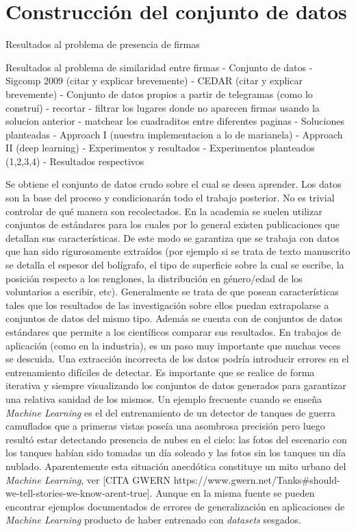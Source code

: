 
\chapter{Construcción del conjunto de datos}

Resultados al problema de presencia de firmas


Resultados al problema de similaridad entre firmas
- Conjunto de datos
	- Sigcomp 2009 (citar y explicar brevemente)
	- CEDAR (citar y explicar brevemente)
	- Conjunto de datos propios a partir de telegramas
	(como lo construí)
		- recortar
		- filtrar los lugares donde no aparecen firmas usando la solucion anterior
		- matchear los cuadraditos entre diferentes paginas
- Soluciones planteadas
	- Approach I (nuestra implementacion a lo de marianela)
	- Approach II (deep learning)
- Experimentos y resultados
	- Experimentos planteados (1,2,3,4)
	- Resultados respectivos


Se obtiene el conjunto de datos crudo sobre el cual se desea aprender. Los datos son la base del proceso y condicionarán todo el trabajo posterior. No es trivial controlar de qué manera son recolectados.
En la academia se suelen utilizar conjuntos de estándares para los cuales por lo general existen publicaciones que detallan sus características. De este modo se garantiza que se trabaja con datos que han sido rigurosamente extraídos (por ejemplo si se trata de texto manuscrito se detalla el espesor del bolígrafo, el tipo de superficie sobre la cual se escribe, la posición respecto a los renglones, la distribución en género/edad de los voluntarios a escribir, etc). Generalmente se trata de que posean características tales que los resultados de las investigación sobre ellos puedan extrapolarse a conjuntos de datos del mismo tipo.
Además se cuenta con de conjuntos de datos estándares que permite a los científicos comparar sus resultados.
En trabajos de aplicación (como en la industria), es un paso muy importante que muchas veces se descuida. Una extracción incorrecta de los datos podría introducir errores en el entrenamiento difíciles de detectar. Es importante que se realice de forma iterativa y siempre visualizando los conjuntos de datos generados para garantizar una relativa sanidad de los mismos.
Un ejemplo frecuente cuando se enseña \textit{Machine Learning} es el del entrenamiento de un detector de tanques de guerra camuflados que a primeras vistas poseía una asombrosa precisión pero luego resultó estar detectando presencia de nubes en el cielo: las fotos del escenario con los tanques habían sido tomadas un día soleado y las fotos sin los tanques un día nublado. Aparentemente esta situación anecdótica constituye un mito urbano del \textit{Machine Learning}, ver [CITA GWERN https://www.gwern.net/Tanks\#should-we-tell-stories-we-know-arent-true]. Aunque en la misma fuente se pueden encontrar ejemplos documentados de errores de generalización en aplicaciones de \textit{Machine Learning} producto de haber entrenado con \textit{datasets} sesgados.

